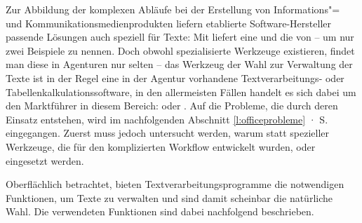 Zur Abbildung der komplexen Abläufe bei der Erstellung von Informations"= und Kommunikationsmedienprodukten liefern etablierte Software-Hersteller passende Lösungen auch speziell für Texte: Mit  liefert  eine  \cite{adobeincopy} und  die  von   \cite{woodwing} -- um nur zwei Beispiele zu nennen. Doch obwohl spezialisierte Werkzeuge existieren, findet man diese in Agenturen nur selten -- das Werkzeug der Wahl zur Verwaltung der Texte ist in der Regel eine in der Agentur vorhandene Textverarbeitungs- oder Tabellenkalkulationssoftware, in den allermeisten Fällen handelt es sich dabei um den Marktführer in diesem Bereich:   oder . Auf die Probleme, die durch deren Einsatz entstehen, wird im nachfolgenden Abschnitt \ref{l:officeprobleme} · S.\pageref{l:officeprobleme} eingegangen. Zuerst muss jedoch untersucht werden, warum statt spezieller Werkzeuge, die für den komplizierten Workflow entwickelt wurden,  oder  eingesetzt werden.

\bigskip

Oberflächlich betrachtet, bieten Textverarbeitungsprogramme die notwendigen Funktionen, um Texte zu verwalten und sind damit scheinbar die natürliche Wahl. Die verwendeten Funktionen sind dabei nachfolgend beschrieben.

